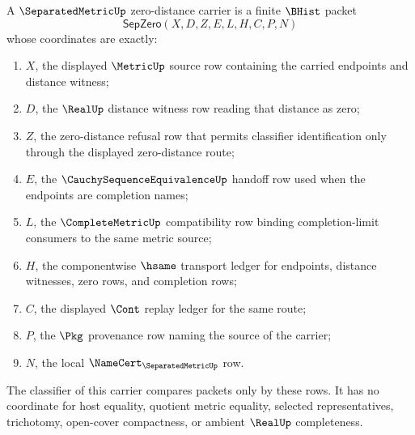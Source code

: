\begin{definition}
\label{def:separated-metric-zero-distance-carrier}
A $\SeparatedMetricUp$ zero-distance carrier is a finite $\BHist$ packet
$$
\mathsf{SepZero}(X,D,Z,E,L,H,C,P,N)
$$
whose coordinates are exactly:
\begin{enumerate}
  \item $X$, the displayed $\MetricUp$ source row containing the carried endpoints and distance witness;
  \item $D$, the $\RealUp$ distance witness row reading that distance as zero;
  \item $Z$, the zero-distance refusal row that permits classifier identification only through the displayed zero-distance route;
  \item $E$, the $\CauchySequenceEquivalenceUp$ handoff row used when the endpoints are completion names;
  \item $L$, the $\CompleteMetricUp$ compatibility row binding completion-limit consumers to the same metric source;
  \item $H$, the componentwise $\hsame$ transport ledger for endpoints, distance witnesses, zero rows, and completion rows;
  \item $C$, the displayed $\Cont$ replay ledger for the same route;
  \item $P$, the $\Pkg$ provenance row naming the source of the carrier;
  \item $N$, the local $\NameCert_{\SeparatedMetricUp}$ row.
\end{enumerate}
The classifier of this carrier compares packets only by these rows. It has no coordinate for host equality, quotient metric equality, selected representatives, trichotomy, open-cover compactness, or ambient $\RealUp$ completeness.
\end{definition}


